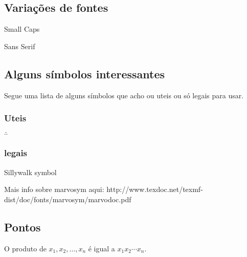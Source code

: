 \documentclass[]{article}
\begin{document}
\subsection{Variações de fontes}
{\sc Small Caps} 

{\sf Sans Serif}

\subsection{Alguns símbolos interessantes}
Segue uma lista de alguns símbolos que acho ou uteis ou só legais para usar.
\subsubsection{Uteis}
$\therefore$

\subsubsection{legais}
Sillywalk symbol \Denarius

Mais info sobre marvosym aqui: http://www.texdoc.net/texmf-dist/doc/fonts/marvosym/marvodoc.pdf
\Sun \Moon   \Mercury   \Venus   \Mars   \Jupiter   \Saturn   \Uranus   \Neptune   \Pluto   \Earth
\CircledA

 \Cross     \CeltCross   \Ankh
 
 \Stopsign    \Biohazard   \Radioactivity
 
 \Coffeecup
\subsection{Pontos}
O produto de $ x_1, x_2, \dots, x_n$ é igual a $x_1 x_2 \cdots x_n$.
\end{document}

